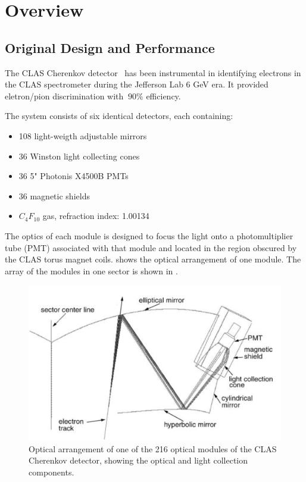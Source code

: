 \section{Overview}



\subsection{Original Design and Performance}

The CLAS Cherenkov detector~\cite{Adams:2001kk} has been instrumental in identifying electrons in the CLAS spectrometer during the Jefferson Lab 6 GeV era.
It provided eletron/pion discrimination with $~90\%$ efficiency.

The system consists of six identical detectors, each containing:

\begin{itemize}
	\item 108 light-weigth adjustable mirrors
	\item 36 Winston light collecting cones
	\item 36 5" Photonis X4500B PMTs
	\item 36 magnetic shields
\item $C_4F_{10}$ gas, refraction index: 1.00134
\end{itemize}


The optics of each module is designed to focus the light onto a photomultiplier tube (PMT) associated with that module and located in the region
obscured by the CLAS torus magnet coils.
 shows the optical arrangement of one module. The array of the modules in one sector is shown in .

\begin{figure}
	\centering
	\includegraphics[width=1.0\columnwidth,keepaspectratio]{img/optics.png}
	\caption{Optical arrangement of one of the 216 optical modules of the CLAS Cherenkov detector, showing the optical and light collection components.}
	\label{fig:optics}
\end{figure}

